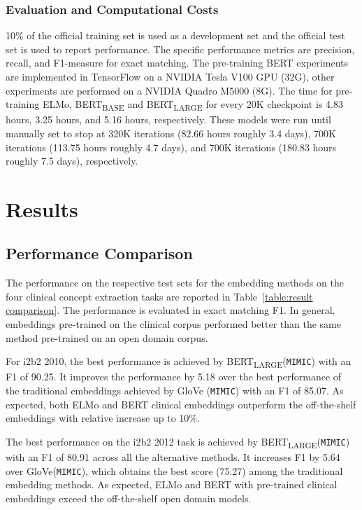 \documentclass[11pt,a4paper]{article}
\begin{document}
\subsubsection{Evaluation and Computational Costs}
10\% of the official training set is used as a development set and the official test set is used to report performance. The specific performance metrics are precision, recall, and F1-measure for exact matching. The pre-training BERT experiments are implemented in TensorFlow \cite{abadi2016tensorflow} on a NVIDIA Tesla V100 GPU (32G), other experiments are performed on a NVIDIA Quadro M5000 (8G). The time for pre-training ELMo, BERT\textsubscript{BASE} and BERT\textsubscript{LARGE} for every 20K checkpoint is 4.83 hours, 3.25 hours, and 5.16 hours, respectively. These models were run until manually set to stop at 320K iterations (82.66 hours  roughly 3.4 days), 700K iterations (113.75 hours  roughly 4.7 days), and 700K iterations (180.83 hours  roughly 7.5 days), respectively.




\section{Results}
\subsection{Performance Comparison}
The performance on the respective test sets for the embedding methods on the four clinical concept extraction tasks are reported in Table~\ref{table:result comparison}. The performance is evaluated in exact matching F1. In general, embeddings pre-trained on the clinical corpus performed better than the same method pre-trained on an open domain corpus.  

For i2b2 2010, the best performance is achieved by BERT\textsubscript{LARGE}(\verb|MIMIC|) with an F1 of 90.25. It improves the performance by 5.18 over the best performance of the traditional embeddings achieved by GloVe (\verb|MIMIC|) with an F1 of 85.07. As expected, both ELMo and BERT clinical embeddings outperform the off-the-shelf embeddings with relative increase up to 10\%. 

The best performance on the i2b2 2012 task is achieved by BERT\textsubscript{LARGE}(\verb|MIMIC|) with an F1 of 80.91 across all the alternative methods. It increases F1 by 5.64 over GloVe(\verb|MIMIC|), which obtains the best score (75.27) among the traditional embedding methods. As expected, ELMo and BERT with pre-trained clinical embeddings exceed the off-the-shelf open domain models.
\end{document}
